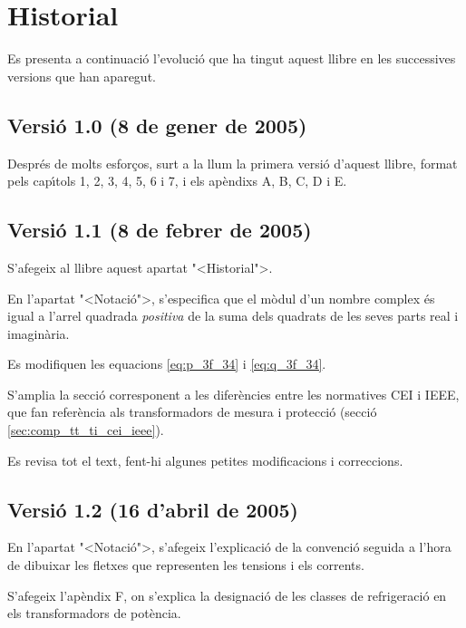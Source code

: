 \chapter*{Historial}

Es presenta a continuaci\'{o} l'evoluci\'{o} que ha tingut aquest llibre en
les successives versions que han aparegut.

\section*{Versi\'{o} 1.0 (8 de gener de 2005)}

Despr\'{e}s de molts esfor\c{c}os, surt a la llum la primera versi\'{o} d'aquest
llibre, format pels cap\'{\i}tols 1, 2, 3, 4, 5, 6 i 7, i els ap\`{e}ndixs A,
B, C, D i E.

\section*{Versi\'{o} 1.1 (8 de febrer de 2005)}

S'afegeix al llibre aquest apartat {"<}Historial{">}.

En l'apartat {"<}Notaci\'{o}{">}, s'especifica que el m\`{o}dul d'un nombre
complex \'{e}s igual a l'arrel quadrada \emph{positiva} de la suma dels
quadrats de les seves parts real i imagin\`{a}ria.

Es modifiquen les equacions \eqref{eq:p_3f_34} i \eqref{eq:q_3f_34}.

S'amplia la secci\'{o} corresponent a les difer\`{e}ncies entre les
normatives \textsf{CEI} i \textsf{IEEE}, que fan refer\`{e}ncia als
transformadors de mesura i protecci\'{o} (secci\'{o}
\ref{sec:comp_tt_ti_cei_ieee}).

Es revisa tot el text, fent-hi algunes petites modificacions i
correccions.

\section*{Versi\'{o} 1.2 (16 d'abril de 2005)}

En l'apartat {"<}Notaci\'{o}{">}, s'afegeix l'explicaci\'{o} de la convenci\'{o}
seguida a l'hora de dibuixar les fletxes que representen les
tensions i els corrents.

S'afegeix l'ap\`{e}ndix F, on s'explica la designaci\'{o} de les classes de
refrigeraci\'{o} en els transformadors de pot\`{e}ncia.

